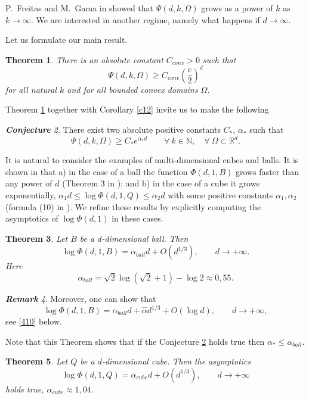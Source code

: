 \documentclass[a4paper,12pt]{article}
\numberwithin{equation}{section}
\def \al{\alpha}
\def \O{\Omega}
\def \N{\mathbb{N}}
\def \R{\mathbb{R}}
\newcommand{\<}{\langle}
\renewcommand{\>}{\rangle}
\theoremstyle{plain}
\newtheorem{theorem}{\bf Theorem}[section]
\theoremstyle{definition}
\theoremstyle{remark}
\newtheorem{rem}[theorem]{\bf Remark}
\newtheorem{conj}[theorem]{\bf Conjecture}
\renewcommand{\le}{\leqslant}
\renewcommand{\ge}{\geqslant}
\begin{document}
P.~Freitas and M.~Gama in \cite{FrG} showed that $\Psi (d,k,\O)$ 
grows as a power of $k$ as $k\to\infty$.
We are interested in another regime, 
namely what happens if $d \to \infty$.

Let us formulate our main result.

\begin{theorem}
\label{t14}
There is an absolute constant $C_{conv} > 0$ such that
\begin{equation*} 
\Psi (d,k,\O) \ge C_{conv} \left(\frac{e}2\right)^d 
\end{equation*}
for all natural $k$ and for all bounded convex domains $\O$.
\end{theorem}

Theorem \ref{t14} together with Corollary \ref{c12} invite us to make the following

\begin{conj}
\label{conj15}
There exist two absolute positive constants $C_*$, $\al_*$ such that
$$
\Psi (d,k,\O) \ge C_* e^{\al_* d} \qquad \forall \ k \in \N, \quad \forall \ \O \subset \R^d.
$$
\end{conj}

It is natural to consider the examples of multi-dimensional cubes and balls.
It is shown in \cite{CMS} that a) in the case of a ball the function $\Phi (d,1,B)$ 
grows faster than any power of $d$ (Theorem 3 in \cite{CMS});
and b) in the case of a cube it grows exponentially,
$\al_1 d \le \log \Phi (d,1,Q) \le \al_2 d$ 
with some positive constants $\al_1, \al_2$ (formula (10) in \cite{CMS}).
We refine these results by explicitly computing 
the asymptotics of $\log \Phi (d,1)$ in these cases.

\begin{theorem}
\label{t16}
Let $B$ be a $d$-dimensional ball.
Then
$$
\log \Phi (d, 1, B) = \al_{ball} d + O (d^{1/3}), \qquad d \to + \infty.
$$
Here
$$
\al_{ball} = \sqrt 2 \log (\sqrt 2 + 1) - \log 2 \approx 0,55.
$$
\end{theorem}

\begin{rem}
Moreover, one can show that
$$
\log \Phi (d, 1, B) = \al_{ball} d + \hat \al d^{1/3} + O (\log d),\qquad d \to + \infty,
$$
see \eqref{410} below.
\end{rem}

Note that this Theorem shows that if the Conjecture \ref{conj15} holds true
then $\al_* \le \al_{ball}$.

\begin{theorem}
\label{t17}
Let $Q$ be a $d$-dimensional cube.
Then the asymptotics
$$
\log \Phi (d, 1, Q) = \al_{cube} d + O (d^{1/3}), \qquad d \to + \infty
$$
holds true, $\al_{cube} \approx 1,04$.
\end{theorem}
\end{document}
